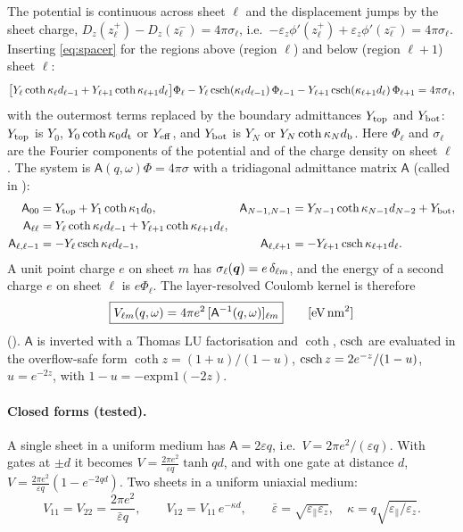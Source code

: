 The potential is continuous across sheet $\ell$ and the displacement jumps by the sheet charge,
$D_z(z_\ell^+)-D_z(z_\ell^-)=4\pi\sigma_\ell$, i.e.\
$-\varepsilon_z\phi'(z_\ell^+)+\varepsilon_z\phi'(z_\ell^-)=4\pi\sigma_\ell$. Inserting \cref{eq:spacer} for
the regions above (region $\ell$) and below (region $\ell+1$) sheet $\ell$:
\begin{equation}
\bigl[Y_\ell\coth\kappa_\ell d_{\ell-1}+Y_{\ell+1}\coth\kappa_{\ell+1}d_\ell\bigr]\Phi_\ell
-Y_\ell\operatorname{csch}(\kappa_\ell d_{\ell-1})\,\Phi_{\ell-1}
-Y_{\ell+1}\operatorname{csch}(\kappa_{\ell+1}d_\ell)\,\Phi_{\ell+1}=4\pi\sigma_\ell ,
\end{equation}
with the outermost terms replaced by the boundary admittances $Y_{\rm top}$ and $Y_{\rm bot}$: $Y_{\rm top}$ is $Y_0$, $Y_0\coth\kappa_0d_{\rm t}$ or
$Y_{\rm eff}$, and $Y_{\rm bot}$ is $Y_N$ or $Y_N\coth\kappa_Nd_{\rm b}$. Here $\Phi_\ell$ and $\sigma_\ell$ are the
Fourier components of the potential and of the charge density on sheet $\ell$. The system is
$\mathsf A(q,\omega)\Phi=4\pi\sigma$ with a tridiagonal admittance matrix $\mathsf A$ (called  in
\code{build\_tridiagonal\_A\_diagonals}):
\begin{align}
\mathsf A_{00}&=Y_{\rm top}+Y_1\coth\kappa_1d_0, &
\mathsf A_{N-1,N-1}&=Y_{N-1}\coth\kappa_{N-1}d_{N-2}+Y_{\rm bot},\nonumber\\
\mathsf A_{\ell\ell}&=Y_\ell\coth\kappa_\ell d_{\ell-1}+Y_{\ell+1}\coth\kappa_{\ell+1}d_\ell, &&\nonumber\\
\mathsf A_{\ell,\ell-1}&=-Y_\ell\operatorname{csch}\kappa_\ell d_{\ell-1}, &
\mathsf A_{\ell,\ell+1}&=-Y_{\ell+1}\operatorname{csch}\kappa_{\ell+1}d_\ell .
\label{eq:Amatrix}
\end{align}
A unit point charge $e$ on sheet $m$ has $\sigma_\ell(\bm q)=e\,\delta_{\ell m}$, and the energy of a second
charge $e$ on sheet $\ell$ is $e\Phi_\ell$. The layer-resolved Coulomb kernel is therefore
\begin{equation}
\boxed{V_{\ell m}(q,\omega)=4\pi e^2\,[\mathsf A^{-1}(q,\omega)]_{\ell m}}
\qquad[\text{eV\,nm}^2]
\label{eq:V}
\end{equation}
(). $\mathsf A$ is inverted with a Thomas LU factorisation and $\coth$, $\operatorname{csch}$
are evaluated in the overflow-safe form $\coth z=(1+u)/(1-u)$, $\operatorname{csch} z=2e^{-z}/(1-u)$, $u=e^{-2z}$, with
$1-u=-\mathrm{expm1}(-2z)$.

\paragraph{Closed forms (tested).} A single sheet in a uniform medium has $\mathsf A=2\varepsilon q$, i.e.\
$V=2\pi e^2/(\varepsilon q)$. With gates at $\pm d$ it becomes $V=\frac{2\pi e^2}{\varepsilon q}\tanh qd$, and with one gate at
distance $d$, $V=\frac{2\pi e^2}{\varepsilon q}(1-e^{-2qd})$. Two sheets in a uniform uniaxial medium:
\begin{equation}
V_{11}=V_{22}=\frac{2\pi e^2}{\bar\varepsilon q},\qquad V_{12}=V_{11}\,e^{-\kappa d},
\qquad \bar\varepsilon=\sqrt{\varepsilon_\parallel\varepsilon_z},\quad\kappa=q\sqrt{\varepsilon_\parallel/\varepsilon_z}.
\label{eq:bilayerV}
\end{equation}

